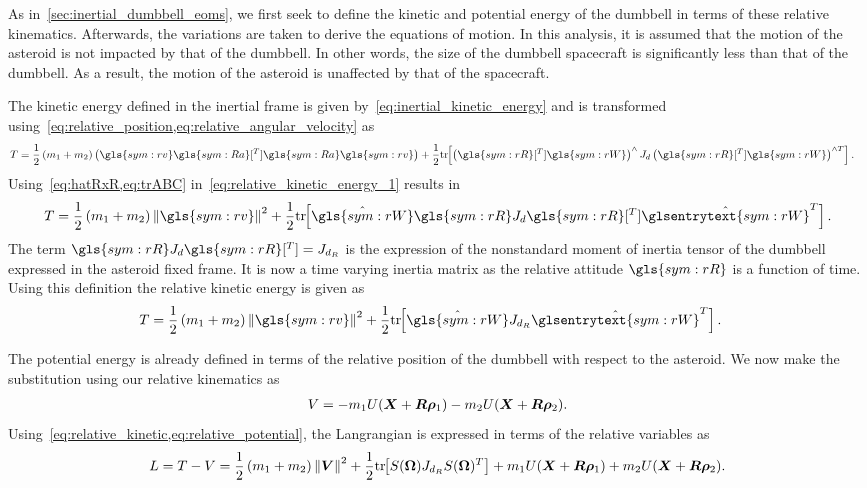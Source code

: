 As in~\cref{sec:inertial_dumbbell_eoms}, we first seek to define the kinetic and potential energy of the dumbbell in terms of these relative kinematics. 
Afterwards, the variations are taken to derive the equations of motion.
In this analysis, it is assumed that the motion of the asteroid is not impacted by that of the dumbbell.
In other words, the size of the dumbbell spacecraft is significantly less than that of the dumbbell. 
As a result, the motion of the asteroid is unaffected by that of the spacecraft.

The kinetic energy defined in the inertial frame is given by~\cref{eq:inertial_kinetic_energy} and is transformed using~\cref{eq:relative_position,eq:relative_angular_velocity} as
\begin{align}\label{eq:relative_kinetic_energy_1}
    T &= \frac{1}{2} \parenth{m_1 + m_2} \parenth{\gls{sym:rv} \gls{sym:Ra}[^T] \gls{sym:Ra} \gls{sym:rv}} + \frac{1}{2} \tr{\parenth{\gls{sym:rR}[^T] \gls{sym:rW}}^\wedge J_d \parenth{\gls{sym:rR}[^T] \gls{sym:rW} }^{\wedge T}}. 
\end{align}
Using~\cref{eq:hatRxR,eq:trABC} in~\cref{eq:relative_kinetic_energy_1} results in
\begin{align}\label{eq:relative_kinetic_energy_2}
    T = \frac{1}{2} \parenth{m_1 + m_2} \norm{\gls{sym:rv}}^2 + \frac{1}{2} \tr{\hat{\gls{sym:rW}} \gls{sym:rR} J_d \gls{sym:rR}[^T] \hat{\glsentrytext{sym:rW}}^T}.
\end{align}
The term \( \gls{sym:rR} J_d \gls{sym:rR}[^T] = J_{d_R}\) is the expression of the nonstandard moment of inertia tensor of the dumbbell expressed in the asteroid fixed frame. 
It is now a time varying inertia matrix as the relative attitude \( \gls{sym:rR} \) is a function of time.
Using this definition the relative kinetic energy is given as
\begin{align}\label{eq:relative_kinetic_energy}
    T &= \frac{1}{2} \parenth{m_1 + m_2} \norm{\gls{sym:rv}}^2 + \frac{1}{2} \tr{\hat{\gls{sym:rW}} J_{d_R} \hat{\glsentrytext{sym:rW}}^T}.
\end{align}

The potential energy is already defined in terms of the relative position of the dumbbell with respect to the asteroid.
We now make the substitution using our relative kinematics as
\begin{align}\label{eq:relative_potential}
    V = -m_1 U(\bm{X} + \bm{R} \bm{\rho}_1) - m_2 U(\bm{X}+\bm{R} \bm{\rho}_2).
\end{align}
Using~\cref{eq:relative_kinetic,eq:relative_potential}, the Langrangian is expressed in terms of the relative variables as 
\begin{align}\label{eq:relative_lagrangian}
    L = T-V = \frac{1}{2} \left( m_1 + m_2 \right) \left\| \bm{V} \right\|^2 + \frac{1}{2} \mathrm{tr}\negthickspace\left[ S(\bm{\Omega}) J_{d_R} S(\bm{\Omega})^T \right] +m_1 U(\bm{X} + \bm{R} \bm{\rho}_1) + m_2 U(\bm{X}+ \bm{R} \bm{\rho}_2) .
\end{align}

